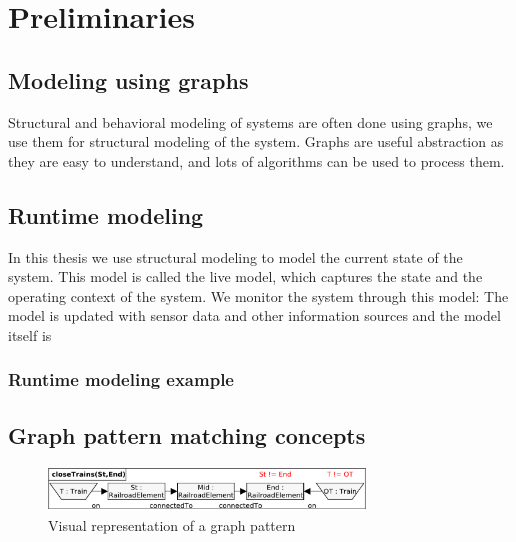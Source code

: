 
\chapter{Preliminaries}



\section{Modeling using graphs}

Structural and behavioral modeling of systems are often done using graphs, we use them for structural modeling of the system. Graphs are useful abstraction as they are easy to understand, and lots of algorithms can be used to process them.

\section{Runtime modeling}

In this thesis we use structural modeling to model the current state of the system. This model is called the live model, which captures the state and the operating context of the system. We monitor the system through this model: The model is updated with sensor data and other information sources and the model itself is 

\subsection{Runtime modeling example}



\section{Graph pattern matching concepts}

\begin{figure}[h]
	\begin{center}
		\includegraphics[width=0.75\textwidth]{figures/pattern-visual.pdf}
		\caption{Visual representation of a graph pattern}
		\label{pattern-visual}
	\end{center}
\end{figure}


